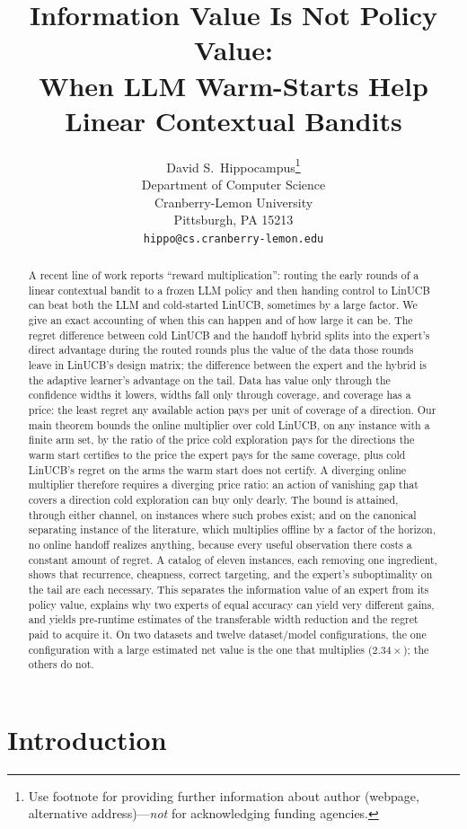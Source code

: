 \documentclass{article}
\title{Information Value Is Not Policy Value:\\ When LLM Warm-Starts Help Linear Contextual Bandits}
\author{%
  David S.~Hippocampus\thanks{Use footnote for providing further information
    about author (webpage, alternative address)---\emph{not} for acknowledging
    funding agencies.} \\
  Department of Computer Science\\
  Cranberry-Lemon University\\
  Pittsburgh, PA 15213 \\
  \texttt{hippo@cs.cranberry-lemon.edu} \\
}
\theoremstyle{definition}
\theoremstyle{remark}
\theoremstyle{remark}
\begin{document}
\maketitle
\begin{abstract}
A recent line of work reports ``reward multiplication'': routing the early
rounds of a linear contextual bandit to a frozen LLM policy and then handing
control to LinUCB can beat both the LLM and cold-started LinUCB, sometimes by a
large factor. We give an exact accounting of when this can happen and of how
large it can be. The regret difference between cold LinUCB and the handoff
hybrid splits into the expert's direct advantage during the routed rounds plus
the value of the data those rounds leave in LinUCB's design matrix; the
difference between the expert and the hybrid is the adaptive learner's
advantage on the tail. Data has value only through the confidence widths it
lowers, widths fall only through coverage, and coverage has a price: the least
regret any available action pays per unit of coverage of a direction. Our
main theorem bounds the online multiplier over cold LinUCB, on any instance
with a finite arm set, by the ratio of the price cold exploration pays for the
directions the warm start certifies to the price the expert pays for the same
coverage, plus cold LinUCB's regret on the arms the warm start does not
certify. A diverging online multiplier therefore requires a diverging price
ratio: an action of vanishing gap that covers a direction cold exploration can
buy only dearly. The bound is attained, through either channel, on instances
where such probes exist; and on the canonical separating instance of the
literature, which multiplies offline by a factor of the horizon, no online
handoff realizes anything, because every useful observation there costs a
constant amount of regret. A catalog of eleven instances, each removing one
ingredient, shows that recurrence, cheapness, correct targeting, and the
expert's suboptimality on the tail are each necessary. This separates the
information value of an expert from its policy value, explains why two experts
of equal accuracy can yield very different gains, and yields pre-runtime
estimates of the transferable width reduction and the regret paid to acquire
it. On two datasets and twelve dataset/model configurations, the one
configuration with a large estimated net value is the one that multiplies
($2.34\times$); the others do not.
\end{abstract}


\section{Introduction}
\label{sec:intro}
\end{document}
